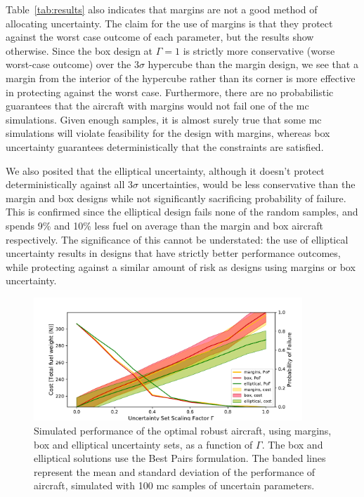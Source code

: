Table~\ref{tab:results} also indicates that margins are not a good method of
allocating uncertainty. The claim for the use of margins is that they protect against
the worst case outcome of each parameter, but the results show otherwise.
Since the box design at $\Gamma=1$ is strictly
more conservative (worse worst-case outcome) over the $3\sigma$ hypercube
than the margin design, we see that a margin from the interior of the hypercube
rather than its corner is more effective in protecting against the worst case.
Furthermore, there are no probabilistic
guarantees that the aircraft
with margins would not fail one of the \gls{mc} simulations. Given enough samples,
it is almost surely true that some \gls{mc} simulations will violate feasibility
for the design with margins,
whereas box uncertainty guarantees deterministically that the constraints are satisfied.

We also posited that the elliptical uncertainty, although it doesn't
protect deterministically against all $3\sigma$ uncertainties, would be less conservative than the
margin and box designs while not significantly sacrificing probability of failure. This is
confirmed since the elliptical design fails none of the random samples,
and spends 9\% and 10\% less fuel on average
than the margin and box aircraft respectively.
The significance of this cannot be understated: the use of elliptical uncertainty
results in designs that have strictly better performance outcomes, while protecting
against a similar amount of risk as designs using margins or box uncertainty.

\begin{figure}[ht]
    \centering
    \captionsetup{justification=centering, font=small}
    \includegraphics[width=0.9\textwidth]{pof_and_cost.pdf}
    \caption{Simulated performance of the optimal robust aircraft, using margins, box and elliptical uncertainty sets,
    as a function of $\Gamma$. The box and elliptical solutions use the Best Pairs formulation.
    The banded lines represent the mean and standard deviation of the performance
    of aircraft, simulated with 100 \gls{mc} samples of uncertain parameters.}
    \label{fig:probOfFailure}
\end{figure}

